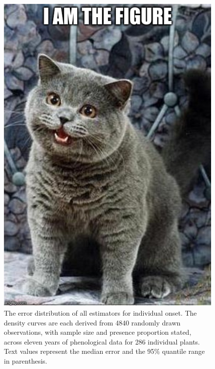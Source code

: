 \begin{figure}
	\centering
		\includegraphics[scale=0.3]{images/figure_filler.jpg}
	\caption[The error distribution of all estimators for individual onset]{The error distribution of all estimators for individual onset. The density curves are each derived from 4840 randomly drawn observations, with sample size and presence proportion stated, across eleven years of phenological data for 286 individual plants. Text values represent the median error and the 95\% quantile range in parenthesis.} \label{fig-3-4}
\end{figure}

